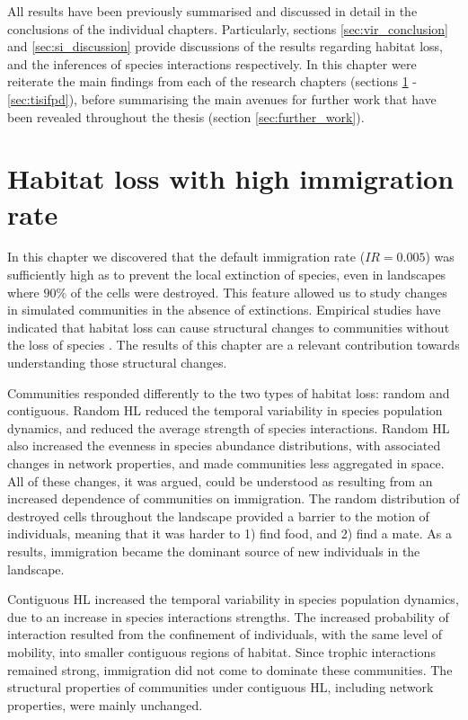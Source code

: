 
All results have been previously summarised and discussed in detail in the conclusions of the individual chapters. Particularly, sections \ref{sec:vir_conclusion} and \ref{sec:si_discussion} provide discussions of the results regarding habitat loss, and the inferences of species interactions respectively. In this chapter were reiterate the main findings from each of the research chapters (sections \ref{sec:hl_hi} - \ref{sec:tisifpd}), before summarising the main avenues for further work that have been revealed throughout the thesis (section \ref{sec:further_work}).

\section{Habitat loss with high immigration rate}
\label{sec:hl_hi}

In this chapter we discovered that the default immigration rate ($IR=0.005$) was sufficiently high as to prevent the local extinction of species, even in landscapes where $90\%$ of the cells were destroyed. This feature allowed us to study changes in simulated communities in the absence of extinctions. Empirical studies have indicated that habitat loss can cause structural changes to communities without the loss of species \cite{albrecht2007interaction,tylianakis2007habitat,hagen2012biodiversity}. The results of this chapter are a relevant contribution towards understanding those structural changes.

Communities responded differently to the two types of habitat loss: random and contiguous. Random HL reduced the temporal variability in species population dynamics, and reduced the average strength of species interactions. Random HL also increased the evenness in species abundance distributions, with associated changes in network properties, and made communities less aggregated in space. All of these changes, it was argued, could be understood as resulting from an increased dependence of communities on immigration. The random distribution of destroyed cells throughout the landscape provided a barrier to the motion of individuals, meaning that it was harder to 1) find food, and 2) find a mate. As a results, immigration became the dominant source of new individuals in the landscape.

Contiguous HL increased the temporal variability in species population dynamics, due to an increase in species interactions strengths. The increased probability of interaction resulted from the confinement of individuals, with the same level of mobility, into smaller contiguous regions of habitat. Since trophic interactions remained strong, immigration did not come to dominate these communities. The structural properties of communities under contiguous HL, including network properties, were mainly unchanged. 

